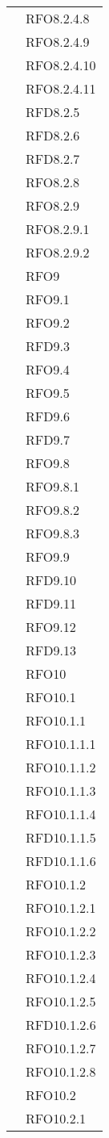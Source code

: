 \begin{longtable}{ p{12cm} | p{4cm} }
& RFO8.2.4.8 \\
& RFO8.2.4.9 \\
& RFO8.2.4.10 \\
& RFO8.2.4.11 \\
& RFD8.2.5 \\
& RFD8.2.6 \\
& RFD8.2.7 \\
& RFO8.2.8 \\
& RFO8.2.9 \\
& RFO8.2.9.1 \\
& RFO8.2.9.2 \\
& RFO9 \\
& RFO9.1 \\
& RFO9.2 \\
& RFD9.3 \\
& RFO9.4 \\
& RFO9.5 \\
& RFD9.6\\
& RFD9.7 \\
& RFO9.8 \\
& RFO9.8.1 \\
& RFO9.8.2 \\
& RFO9.8.3 \\
& RFO9.9 \\
& RFD9.10 \\
& RFD9.11 \\
& RFO9.12 \\
& RFD9.13 \\
& RFO10 \\
& RFO10.1 \\
& RFO10.1.1 \\
& RFO10.1.1.1 \\
& RFO10.1.1.2 \\
& RFO10.1.1.3 \\
& RFO10.1.1.4 \\
& RFD10.1.1.5 \\
& RFD10.1.1.6 \\
& RFO10.1.2 \\
& RFO10.1.2.1 \\
& RFO10.1.2.2 \\
& RFO10.1.2.3 \\
& RFO10.1.2.4 \\
& RFO10.1.2.5 \\
& RFD10.1.2.6 \\
& RFO10.1.2.7 \\
& RFO10.1.2.8 \\
& RFO10.2 \\
& RFO10.2.1 \\

\end{longtable}
